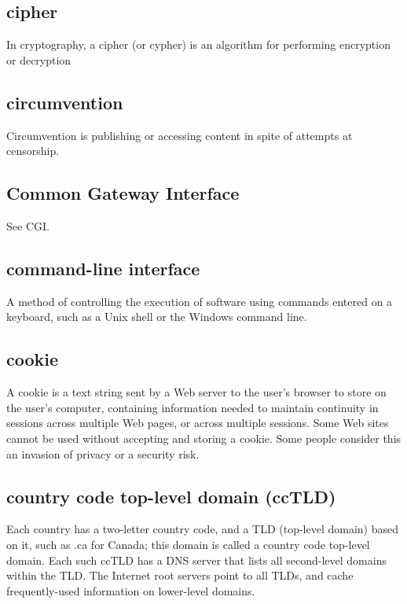 \subsection{cipher}

In cryptography, a cipher (or cypher) is an algorithm for performing
encryption or decryption

\subsection{circumvention}

Circumvention is publishing or accessing content in spite of attempts at
censorship.

\subsection{Common Gateway Interface}

See CGI.

\subsection{command-line interface}

A method of controlling the execution of software using commands entered
on a keyboard, such as a Unix shell or the Windows command line.

\subsection{cookie}

A cookie is a text string sent by a Web server to the user's browser to
store on the user's computer, containing information needed to maintain
continuity in sessions across multiple Web pages, or across multiple
sessions. Some Web sites cannot be used without accepting and storing a
cookie. Some people consider this an invasion of privacy or a security
risk.

\subsection{country code top-level domain (ccTLD)}

Each country has a two-letter country code, and a TLD (top-level domain)
based on it, such as .ca for Canada; this domain is called a country
code top-level domain. Each such ccTLD has a DNS server that lists all
second-level domains within the TLD. The Internet root servers point to
all TLDs, and cache frequently-used information on lower-level domains.


